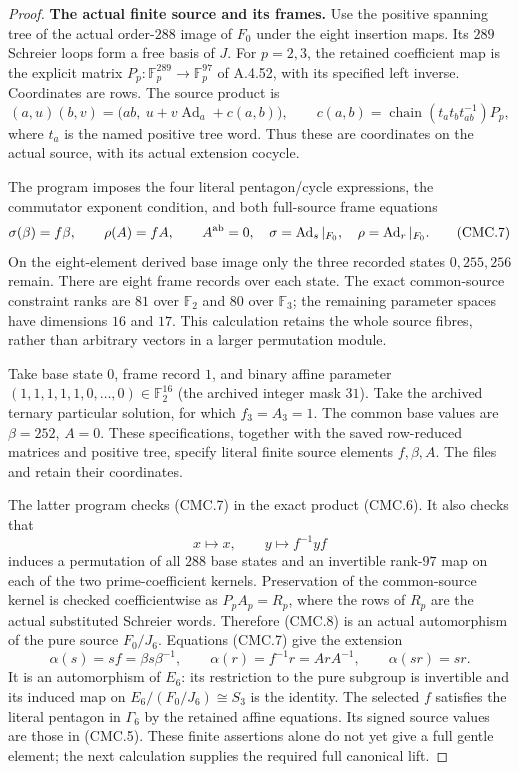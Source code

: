 \begin{proof}
\par\medskip\noindent\textbf{The actual finite source and its frames.}
Use the positive spanning tree of the actual order-$288$ image of $F_0$
under the eight insertion maps.  Its $289$ Schreier loops form a free basis
of $J$.  For $p=2,3$, the retained coefficient map is the explicit matrix
$P_p:\mathbb F_p^{289}\to\mathbb F_p^{97}$ of A.4.52, with its
specified left inverse.  Coordinates are rows.  The source product is
\[
 (a,u)(b,v)=\bigl(ab,\ u+v\operatorname{Ad}_a+c(a,b)\bigr),
 \qquad
 c(a,b)=\operatorname{chain}(t_at_bt_{ab}^{-1})P_p,
 \tag{CMC.6}
\]
where $t_a$ is the named positive tree word.  Thus these are coordinates
on the actual source, with its actual extension cocycle.

The program  imposes the four literal
pentagon/cycle expressions, the commutator exponent condition, and both
full-source frame equations
\[
 \sigma(\beta)=f\beta,\qquad \rho(A)=fA,\qquad A^{\rm ab}=0,
 \quad
 \sigma=\operatorname{Ad}_s|_{F_0},\quad
 \rho=\operatorname{Ad}_r|_{F_0}.
 \tag{CMC.7}
\]
On the eight-element derived base image only the three recorded states
$0,255,256$ remain.  There are eight frame records over each state.
The exact common-source constraint ranks are $81$ over $\mathbb F_2$
and $80$ over $\mathbb F_3$; the remaining parameter spaces have
dimensions $16$ and $17$.  This calculation retains the whole source
fibres, rather than arbitrary vectors in a larger permutation module.

Take base state $0$, frame record $1$, and binary affine parameter
$(1,1,1,1,1,0,\ldots,0)\in\mathbb F_2^{16}$ (the archived integer
mask $31$).  Take the archived ternary particular solution, for which
$f_3=A_3=1$.  The common base values are $\beta=252$, $A=0$.
These specifications, together with the saved row-reduced matrices and
positive tree, specify literal finite source elements $f,\beta,A$.
The files  and
 retain their coordinates.

The latter program checks (CMC.7) in the exact product (CMC.6).
It also checks that
\[
 x\longmapsto x,\qquad y\longmapsto f^{-1}yf
 \tag{CMC.8}
\]
induces a permutation of all $288$ base states and an invertible rank-$97$
map on each of the two prime-coefficient kernels.  Preservation of the
common-source kernel is checked coefficientwise as
$P_p A_p=R_p$, where the rows of $R_p$ are the actual substituted
Schreier words.  Therefore (CMC.8) is an actual automorphism of the pure
source $F_0/J_6$.  Equations (CMC.7) give the extension
\[
 \alpha(s)=sf=\beta s\beta^{-1},\qquad
 \alpha(r)=f^{-1}r=ArA^{-1},\qquad \alpha(sr)=sr.
 \tag{CMC.9}
\]
It is an automorphism of $E_6$: its restriction to the pure subgroup is
invertible and its induced map on $E_6/(F_0/J_6)\cong S_3$ is the
identity.  The selected $f$ satisfies the literal pentagon in
$\Gamma_6$ by the retained affine equations.  Its signed source values
are those in (CMC.5).  These finite assertions alone do not yet give a
full gentle element; the next calculation supplies the required full
canonical lift.


\end{proof}

